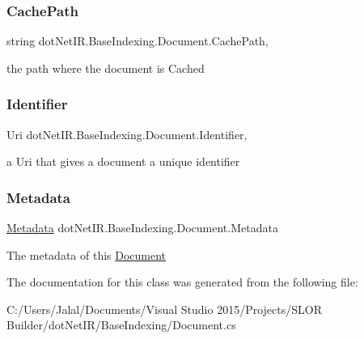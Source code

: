 \subsubsection{\texorpdfstring{Cache\+Path}{CachePath}}
{\footnotesize\ttfamily string dot\+Net\+I\+R.\+Base\+Indexing.\+Document.\+Cache\+Path\hspace{0.3cm}{\ttfamily [get]}, {\ttfamily [set]}}



the path where the document is Cached 

\hypertarget{classdot_net_i_r_1_1_base_indexing_1_1_document_a431f21775d46575b1fe5b8ae0305eba0}{}\label{classdot_net_i_r_1_1_base_indexing_1_1_document_a431f21775d46575b1fe5b8ae0305eba0} 
\subsubsection{\texorpdfstring{Identifier}{Identifier}}
{\footnotesize\ttfamily Uri dot\+Net\+I\+R.\+Base\+Indexing.\+Document.\+Identifier\hspace{0.3cm}{\ttfamily [get]}, {\ttfamily [set]}}



a Uri that gives a document a unique identifier 

\hypertarget{classdot_net_i_r_1_1_base_indexing_1_1_document_a4de0f26b50e8fcb9a37519ba300a3586}{}\label{classdot_net_i_r_1_1_base_indexing_1_1_document_a4de0f26b50e8fcb9a37519ba300a3586} 
\subsubsection{\texorpdfstring{Metadata}{Metadata}}
{\footnotesize\ttfamily \hyperlink{classdot_net_i_r_1_1_base_indexing_1_1_metadata}{Metadata} dot\+Net\+I\+R.\+Base\+Indexing.\+Document.\+Metadata\hspace{0.3cm}{\ttfamily [get]}}



The metadata of this \hyperlink{classdot_net_i_r_1_1_base_indexing_1_1_document}{Document} 



The documentation for this class was generated from the following file\+:\begin{DoxyCompactItemize}
\item 
C\+:/\+Users/\+Jalal/\+Documents/\+Visual Studio 2015/\+Projects/\+S\+L\+O\+R Builder/dot\+Net\+I\+R/\+Base\+Indexing/Document.\+cs\end{DoxyCompactItemize}
